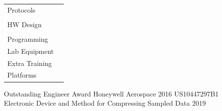\documentclass[]{awesome-cv}
\begin{document}
\vspace*{0mm}

\begin{cventries}
	\cventry
	{\def\arraystretch{1.5}{\begin{tabular}{ l l}
		Protocols & {\skill{ Ethernet (2.5G/10G), PoE (802.3af/at/bt), USB, DDR, I2C, SPI, MDIO, PCIe, HDMI, MIPI}} \\
		 & {\skill{ UART, JTAG, CAN, SFP/SFP28, GPS}} \\
		HW Design & {\skill{ Cadence Allegro, OrCAD, Mentor Graphics, CADSTAR, SPICE, Schematic capture, PCB layout}} \\
		 & {\skill{ SI/PI, EMI/EMC, Thermal Architecture, DFM/DFT, Surge/ESD/HiPOT, PoE System Design, Grounding/Isolation}} \\
		Programming & {\skill{ Python, PowerShell, MATLAB, Git, TestStand, VISA, AI-assisted engineering, MCP, LLM workflows}} \\
		Lab Equipment & {\skill{ Oscilloscopes, multimeters, spectrum/network/logic analyzers, power supplies, PXI, DAQ}} \\
		Extra Training & {\skill{ Advanced GNSS/GPS, Radar Systems Certificate, MIL-STD 1553, Six Sigma Green Belt}} \\
		Platforms & {\skill{ Jira, Confluence, Arena PLM, Linux, Google Workspace, Azure DevOps}} \\
		\end{tabular}}}
	{}
	{}
	{}
	{}
\end{cventries}
\vspace{-6mm}

\begin{cvhonors}
	\cvhonor
	{Outstanding Engineer Award}
	{Honeywell Aerospace }
	{}
	{2016}
	\cvhonor
	{US10447297B1}
	{Electronic Device and Method for Compressing Sampled Data }
	{}
	{2019}
\end{cvhonors}
\end{document}
